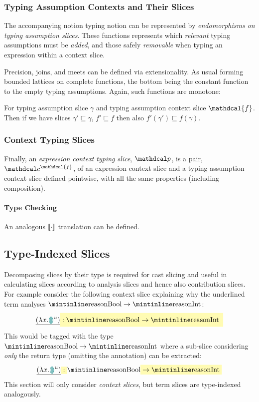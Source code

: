 \subsubsection{Typing Assumption Contexts and Their Slices}
The accompanying notion typing notion can be represented by \textit{endomorphisms on typing assumption slices}. These functions represents which \textit{relevant} typing assumptions must be \textit{added}, and those safely \textit{removable} when typing an expression within a context slice.

\renewcommand{\F}{\mathdcal{F}}
\newcommand{\f}{\mathdcal{f}}

Precision, joins, and meets can be defined via extensionality. As usual forming bounded lattices on complete functions, the bottom being the constant function to the empty typing assumptions. Again, such functions are monotone:
\begin{proposition}
For typing assumption slice $\gamma$ and typing assumption context slice $\f$. Then if we have slices $\gamma' \sqsubseteq \gamma$, $f' \sqsubseteq f$ then also $f'(\gamma') \sqsubseteq f(\gamma)$.
\end{proposition}
\subsubsection{Context Typing Slices}
Finally, an \textit{expression context typing slice}, $\p$, is a pair, $\Cs^\f$, of an expression context slice and a typing assumption context slice defined pointwise, with all the same properties (including composition).

\paragraph{Type Checking} An analogous $\llbracket \cdot \rrbracket$ translation can be defined.

\subsection{Type-Indexed Slices}\label{sec:TypeIndexedSlices}
Decomposing slices by their type is required for cast slicing and useful in calculating slices according to analysis slices and hence also contribution slices. For example consider the following context slice explaining why the underlined term analyses $\code{Bool} \to \code{Int}$:
\[\underline{(\lambda x. \hole^u )} \hlcmaths[yellow!30]{:  \code{Bool} \hlcmaths[yellow!30]{\to \code{Int}}}\]
This would be tagged with the type $\code{Bool} \to \code{Int}$ where a sub-slice considering \textit{only} the  return type (omitting the  annotation) can be extracted:
\[\underline{(\lambda x. \hole^u )} \hlcmaths[yellow!30]{:}  \code{Bool} \hlcmaths[yellow!30]{\to \code{Int}}\]
This section will only consider \textit{context slices}, but term slices are type-indexed analogously.

